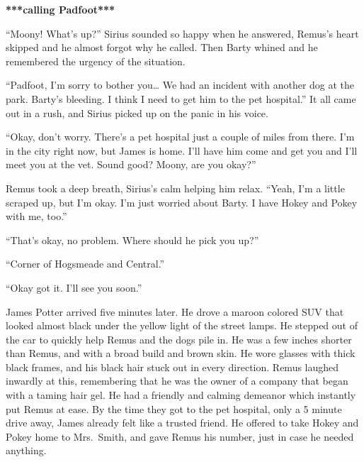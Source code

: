 \documentclass[12pt,twoside,openright]{memoir}
\begin{document}
\textbf{***calling Padfoot***} 

``Moony! What's up?'' Sirius sounded so happy when he answered, Remus's heart skipped and he almost forgot why he called. Then Barty whined and he remembered the urgency of the situation.

``Padfoot, I'm sorry to bother you… We had an incident with another dog at the park. Barty's bleeding. I think I need to get him to the pet hospital.'' It all came out in a rush, and Sirius picked up on the panic in his voice.

``Okay, don't worry. There's a pet hospital just a couple of miles from there. I'm in the city right now, but James is home. I'll have him come and get you and I'll meet you at the vet. Sound good? Moony, are you okay?''

Remus took a deep breath, Sirius's calm helping him relax. ``Yeah, I'm a little scraped up, but I'm okay. I'm just worried about Barty. I have Hokey and Pokey with me, too.''

``That's okay, no problem. Where should he pick you up?''

``Corner of Hogsmeade and Central.''

``Okay got it. I'll see you soon.''

James Potter arrived five minutes later. He drove a maroon colored SUV that looked almost black under the yellow light of the street lamps. He stepped out of the car to quickly help Remus and the dogs pile in. He was a few inches shorter than Remus, and with a broad build and brown skin. He wore glasses with thick black frames, and his black hair stuck out in every direction. Remus laughed inwardly at this, remembering that he was the owner of a company that began with a taming hair gel. He had a friendly and calming demeanor which instantly put Remus at ease. By the time they got to the pet hospital, only a 5 minute drive away, James already felt like a trusted friend. He offered to take Hokey and Pokey home to Mrs.\ Smith, and gave Remus his number, just in case he needed anything.
\end{document}
